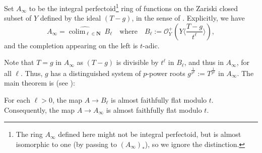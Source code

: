 \documentclass[10pt,reqno]{amsart}
\newcommand{\colim}{\mathop{\mathrm{colim}}}
\begin{document}
\begin{definition}
Set $A_\infty$ to be the integral perfectoid\footnote{The ring $A_\infty$ defined here might not be integral perfectoid, but is almost isomorphic to one (by passing to $(A_\infty)_{\ast}$), so we ignore the distinction.} ring of functions on the Zariski closed subset of $Y$ defined by the ideal $(T - g)$, in the sense of \cite[\S II.2]{ScholzeTorsion}. Explicitly, we have
\[ A_\infty = \widehat{\colim_{\ell \in \mathbf{N}}} \ B_\ell \quad \text{where} \quad B_\ell := \mathcal{O}_Y^+(Y\langle \frac{T-g}{t^\ell} \rangle), \]  
and the completion appearing on the left is $t$-adic. 
 \end{definition}



 Note that $T = g$ in $A_\infty$ as $(T-g)$ is divisible by $t^\ell$ in $B_\ell$, and thus in $A_\infty$, for all $\ell$. Thus, $g$ has a distinguished system of $p$-power roots $g^{\frac{1}{p^k}} := T^{\frac{1}{p^k}}$ in $A_\infty$. The main theorem is (see \cite[\S 2.5]{AndreDSC}):

\begin{theorem}[Andr\'e]
\label{thm:AdjoinRootsDisc}
For each $\ell > 0$, the map $A \to B_\ell$ is almost faithfully flat modulo $t$. Consequently, the map $A \to A_\infty$ is almost faithfully flat modulo $t$. 
\end{theorem}
\end{document}
